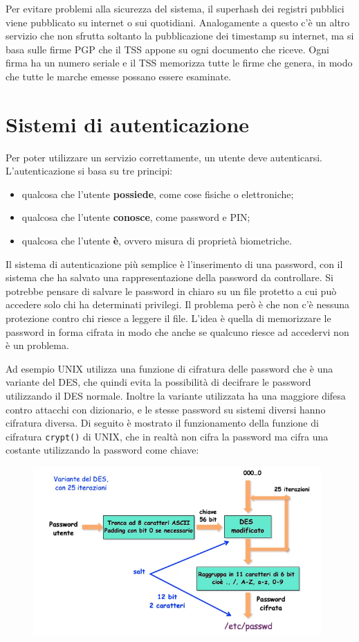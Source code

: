Per evitare problemi alla sicurezza del sistema, il superhash dei registri pubblici viene pubblicato su internet o sui quotidiani. Analogamente a questo c'è un altro servizio che non sfrutta soltanto la pubblicazione dei timestamp su internet, ma si basa sulle firme PGP che il TSS appone su ogni documento che riceve. Ogni firma ha un numero seriale e il TSS memorizza tutte le firme che genera, in modo che tutte le marche emesse possano essere esaminate. 

\section{Sistemi di autenticazione}
Per poter utilizzare un servizio correttamente, un utente deve autenticarsi. L'autenticazione si basa su tre principi:
\begin{itemize}
    \item qualcosa che l'utente \textbf{possiede}, come cose fisiche o elettroniche;
    \item qualcosa che l'utente \textbf{conosce}, come password e PIN;
    \item qualcosa che l'utente \textbf{è}, ovvero misura di proprietà biometriche.
\end{itemize}

Il sistema di autenticazione più semplice è l'inserimento di una password, con il sistema che ha salvato una rappresentazione della password da controllare. Si potrebbe pensare di salvare le password in chiaro su un file protetto a cui può accedere solo chi ha determinati privilegi. Il problema però è che non c'è nessuna protezione contro chi riesce a leggere il file. L'idea è quella di memorizzare le password in forma cifrata in modo che anche se qualcuno riesce ad accedervi non è un problema. 

Ad esempio UNIX utilizza una funzione di cifratura delle password che è una variante del DES, che quindi evita la possibilità di decifrare le password utilizzando il DES normale. Inoltre la variante utilizzata ha una maggiore difesa contro attacchi con dizionario, e le stesse password su sistemi diversi hanno cifratura diversa. Di seguito è mostrato il funzionamento della funzione di cifratura \texttt{crypt()} di UNIX, che in realtà non cifra la password ma cifra una costante utilizzando la password come chiave:

\begin{figure}[htb!]
    \centering
    \includegraphics[width=11cm]{./Images/cap1/1.56.png}
\end{figure} 

